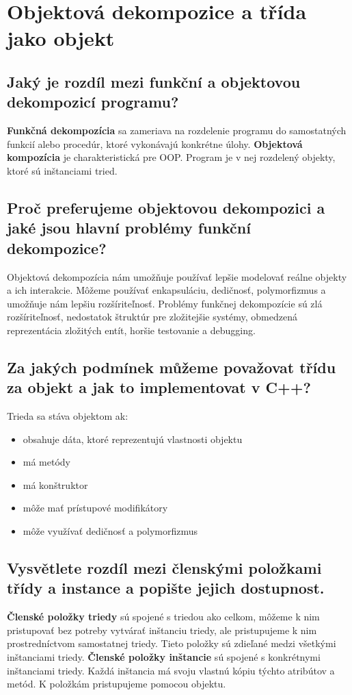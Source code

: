 \section{Objektová dekompozice a třída jako objekt}
\subsection{Jaký je rozdíl mezi funkční a objektovou dekompozicí programu?}
\textbf{Funkčná dekompozícia} sa zameriava na rozdelenie programu do samostatných funkcií alebo procedúr, ktoré vykonávajú konkrétne úlohy.\newline
\textbf{Objektová kompozícia} je charakteristická pre OOP. Program je v nej rozdelený objekty, ktoré sú inštanciami tried.

\subsection{Proč preferujeme objektovou dekompozici a jaké jsou hlavní problémy funkční
dekompozice?}
Objektová dekompozícia nám umožňuje používať lepšie modelovať reálne objekty a ich interakcie. Môžeme používať enkapsuláciu, dedičnosť, polymorfizmus a umožňuje nám lepšiu rozšíriteľnosť. \newline
Problémy funkčnej dekompozície sú zlá rozšíriteľnosť, nedostatok štruktúr pre zložitejšie systémy, obmedzená reprezentácia zložitých entít, horšie testovanie a debugging.

\subsection{Za jakých podmínek můžeme považovat třídu za objekt a jak to implementovat v
C++?}
Trieda sa stáva objektom ak:
\begin{itemize}
    \item obsahuje dáta, ktoré reprezentujú vlastnosti objektu
    \item má metódy
    \item má konštruktor
    \item môže mať prístupové modifikátory
    \item môže využívať dedičnosť a polymorfizmus
\end{itemize}

\subsection{Vysvětlete rozdíl mezi členskými položkami třídy a instance a popište jejich
dostupnost.}
\textbf{Členské položky triedy} sú spojené s triedou ako celkom, môžeme k nim pristupovať bez potreby vytvárať inštanciu triedy, ale pristupujeme k nim prostredníctvom samostatnej triedy. Tieto položky sú zdieľané medzi všetkými inštanciami triedy. \newline
\textbf{Členské položky inštancie} sú spojené s konkrétnymi inštanciami triedy. Každá inštancia má svoju vlastnú kópiu týchto atribútov a metód. K položkám pristupujeme pomocou objektu.

